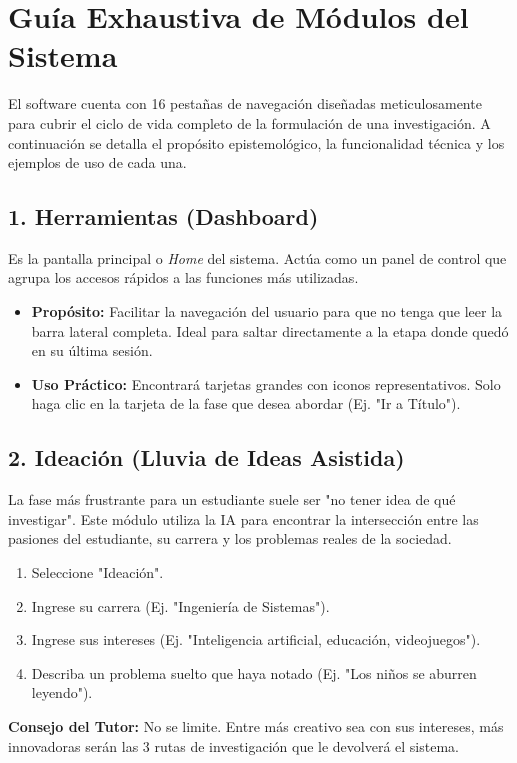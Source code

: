 \documentclass[12pt,a4paper]{article}
\begin{document}
\newpage
\section{Guía Exhaustiva de Módulos del Sistema}

El software cuenta con 16 pestañas de navegación diseñadas meticulosamente para cubrir el ciclo de vida completo de la formulación de una investigación. A continuación se detalla el propósito epistemológico, la funcionalidad técnica y los ejemplos de uso de cada una.

\subsection{1. Herramientas (Dashboard)}
Es la pantalla principal o \textit{Home} del sistema. Actúa como un panel de control que agrupa los accesos rápidos a las funciones más utilizadas. 
\begin{itemize}
    \item \textbf{Propósito:} Facilitar la navegación del usuario para que no tenga que leer la barra lateral completa. Ideal para saltar directamente a la etapa donde quedó en su última sesión.
    \item \textbf{Uso Práctico:} Encontrará tarjetas grandes con iconos representativos. Solo haga clic en la tarjeta de la fase que desea abordar (Ej. "Ir a Título").
\end{itemize}

\subsection{2. Ideación (Lluvia de Ideas Asistida)}
La fase más frustrante para un estudiante suele ser "no tener idea de qué investigar". Este módulo utiliza la IA para encontrar la intersección entre las pasiones del estudiante, su carrera y los problemas reales de la sociedad.
\begin{tcolorbox}[colback=lightgray, colframe=primary, title=Paso a Paso]
\begin{enumerate}
    \item Seleccione "Ideación".
    \item Ingrese su carrera (Ej. "Ingeniería de Sistemas").
    \item Ingrese sus intereses (Ej. "Inteligencia artificial, educación, videojuegos").
    \item Describa un problema suelto que haya notado (Ej. "Los niños se aburren leyendo").
\end{enumerate}
\end{tcolorbox}
\textbf{Consejo del Tutor:} No se limite. Entre más creativo sea con sus intereses, más innovadoras serán las 3 rutas de investigación que le devolverá el sistema.
\end{document}
